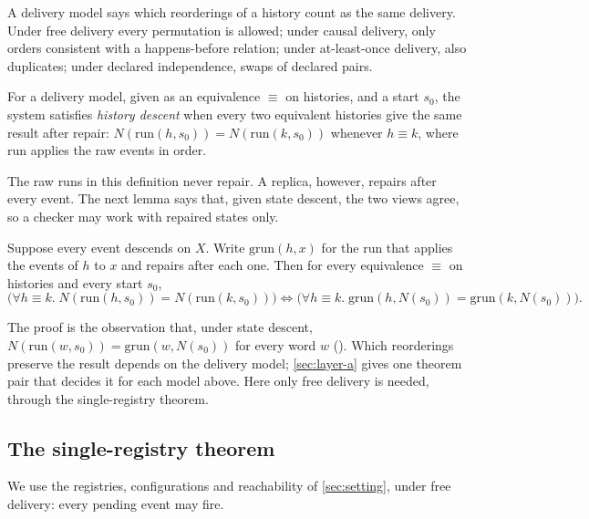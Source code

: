 A delivery model says which reorderings of a history count as the same delivery. Under free delivery
every permutation is allowed; under causal delivery, only orders consistent with a happens-before
relation; under at-least-once delivery, also duplicates; under declared independence, swaps of
declared pairs.

\begin{definition}\label{def:history}
For a delivery model, given as an equivalence $\equiv$ on histories, and a start $s_0$, the system
satisfies \emph{history descent} when every two equivalent histories give the same result after
repair: $N(\mathrm{run}(h, s_0)) = N(\mathrm{run}(k, s_0))$ whenever $h \equiv k$, where
$\mathrm{run}$ applies the raw events in order.
\end{definition}

The raw runs in this definition never repair. A replica, however, repairs after every event. The next
lemma says that, given state descent, the two views agree, so a checker may work with repaired states
only.

\begin{lemma}\label{lem:transfer}
Suppose every event descends on $X$. Write $\mathrm{grun}(h, x)$ for the run that applies the events
of $h$ to $x$ and repairs after each one. Then for every equivalence $\equiv$ on histories and every
start $s_0$,
\[
  \bigl(\forall h \equiv k.\; N(\mathrm{run}(h, s_0)) = N(\mathrm{run}(k, s_0))\bigr)
  \iff
  \bigl(\forall h \equiv k.\; \mathrm{grun}(h, N(s_0)) = \mathrm{grun}(k, N(s_0))\bigr).
\]
\end{lemma}

The proof is the observation that, under state descent, $N(\mathrm{run}(w, s_0)) =
\mathrm{grun}(w, N(s_0))$ for every word $w$ (). Which reorderings preserve
the result depends on the delivery model; \cref{sec:layer-a} gives one theorem pair that decides it for
each model above. Here only free delivery is needed, through the single-registry theorem.

\subsection{The single-registry theorem}\label{sec:main-single}

We use the registries, configurations and reachability of \cref{sec:setting}, under free delivery:
every pending event may fire.

